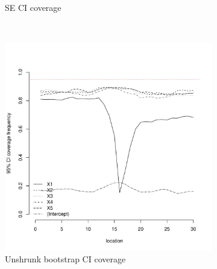\documentclass[authoryear, review, 11pt]{elsarticle}
\begin{document}
\begin{figure}
\begin{subfigure}[b]{0.45\textwidth}
		\caption{SE CI coverage}
	\end{subfigure}%
	\\%
	\begin{subfigure}[b]{0.45\textwidth}
	\centering
		\includegraphics[width=\textwidth]{../../figures/simulation/15.11.profile_unshrunk_bootstrap_coverage.pdf}
		\caption{Unshrunk bootstrap CI coverage}
	\end{subfigure}%
	~ %
	\begin{subfigure}[b]{0.45\textwidth}
	\centering

\end{subfigure}
\end{figure}
\end{document}
